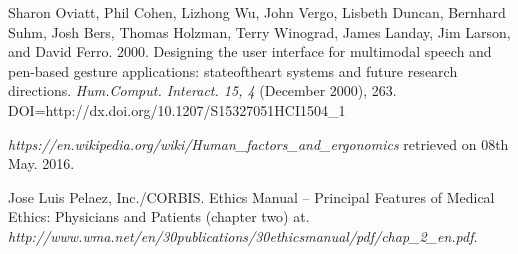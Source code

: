 \begin{thebibliography}{}
\bibitem{} Sharon Oviatt, Phil Cohen, Lizhong Wu, John Vergo, Lisbeth Duncan, Bernhard Suhm, Josh Bers, Thomas Holzman, Terry Winograd, James Landay, Jim Larson, and David Ferro. 2000. Designing the user interface for multimodal speech and pen-based gesture applications: state\-of\-the\-art systems and future research directions. \emph{Hum.\-Comput. Interact. 15, 4} (December 2000), 263. DOI=http://dx.doi.org/10.1207/S15327051HCI1504\_1

\bibitem{} \emph{https://en.wikipedia.org/wiki/Human\_factors\_and\_ergonomics} retrieved on 08th May. 2016.

\bibitem{} Jose Luis Pelaez, Inc./CORBIS. Ethics Manual – Principal Features of Medical Ethics: Physicians and Patients (chapter two) at. \emph{http://www.wma.net/en/30publications/30ethicsmanual/pdf/chap\_2\_en.pdf}.

\end{thebibliography}
